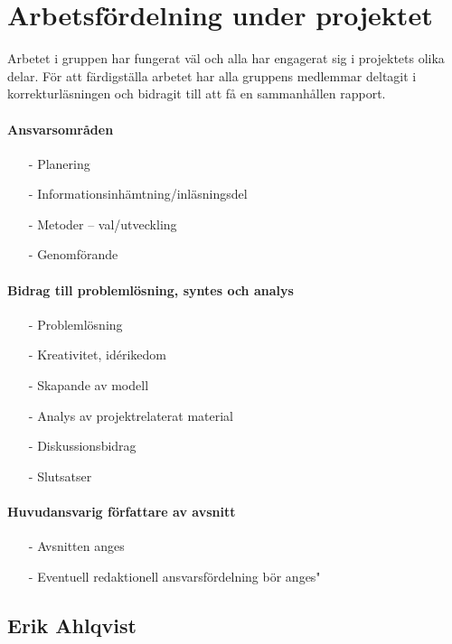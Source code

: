 \documentclass[12pt,a4paper]{article}
\begin{document}

\section*{Arbetsfördelning under projektet}

Arbetet i gruppen har fungerat väl och alla har engagerat sig i projektets olika delar. För att färdigställa arbetet har alla gruppens medlemmar deltagit i korrekturläsningen och bidragit till att få en sammanhållen rapport.

\paragraph{Ansvarsområden}
\begin{itemize}
\item[-]Planering
\item[-]Informationsinhämtning/inläsningsdel
\item[-]Metoder -- val/utveckling 
\item[-]Genomförande 
\end{itemize}
\paragraph{Bidrag till problemlösning, syntes och analys}
\begin{itemize}
\item[-]Problemlösning 
\item[-]Kreativitet, idérikedom
\item[-]Skapande av modell
\item[-]Analys av projektrelaterat material 
\item[-]Diskussionsbidrag
\item[-]Slutsatser 
\end{itemize}
\paragraph{Huvudansvarig författare av avsnitt}
\begin{itemize}
\item[-]Avsnitten anges
\item[-]Eventuell redaktionell ansvarsfördelning bör anges"
\end{itemize}


\subsection*{Erik Ahlqvist}
\end{document}
